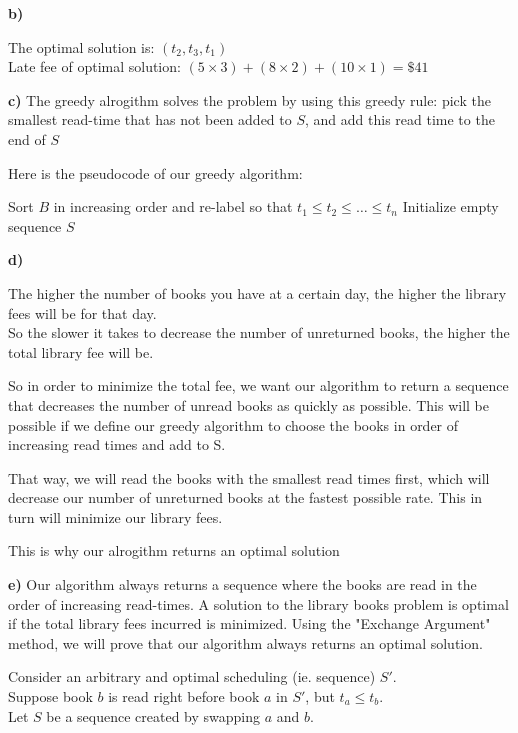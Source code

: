 \documentclass{article}
\begin{document}
\textbf{b)} 

The optimal solution is: $(t_2, t_3, t_1)$\\
Late fee of optimal solution: $(5 \times 3) + (8 \times 2) + (10 \times 1) = \$41$


\textbf{c)}
The greedy alrogithm solves the problem by using this greedy rule: pick the smallest read-time that has not been added to $S$, and add this read time to the end of $S$

Here is the pseudocode of our greedy algorithm:

\begin{algorithm}[H]
\DontPrintSemicolon
\SetAlgoLined
{} %

 {
\;
    Sort $B$ in increasing order and re-label so that $t_1 \leq t_2 \leq \dotsc \leq t_n$\;
    Initialize empty sequence $S$\;
\;
\;
}


\end{algorithm}

\textbf{d)}

The higher the number of books you have at a certain day, the higher the library fees will be for that day.\\ 
So the slower it takes to decrease the number of unreturned books, the higher the total library fee will be.

So in order to minimize the total fee, we want our algorithm to return a sequence that decreases the number of unread books as quickly as possible. This will be possible if we define our greedy algorithm to choose the books in order of increasing read times and add to S.

That way, we will read the books with the smallest read times first, which will decrease our number of unreturned books at the fastest possible rate. This in turn will minimize our library fees.

This is why our alrogithm returns an optimal solution


\textbf{e)}
Our algorithm always returns a sequence where the books are read in the order of increasing read-times. A solution to the library books problem is optimal if the total library fees incurred is minimized.  Using the "Exchange Argument" method, we will prove that our algorithm always returns an optimal solution.

Consider an arbitrary and optimal scheduling (ie. sequence) $S'$.\\
Suppose book $b$ is read right before book $a$ in $S'$, but $t_a \leq t_b$.\\
Let $S$ be a sequence created by swapping $a$ and $b$.
\end{document}
